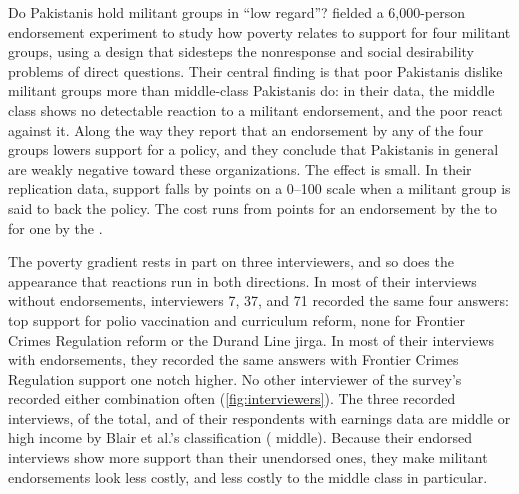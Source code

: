 \documentclass[11pt,letterpaper]{article}
\begin{document}
Do Pakistanis hold militant groups in ``low regard''? \citet{blair2013poverty} fielded a 6,000-person endorsement experiment to study how poverty relates to support for four militant groups, using a design that sidesteps the nonresponse and social desirability problems of direct questions. Their central finding is that poor Pakistanis dislike militant groups more than middle-class Pakistanis do: in their data, the middle class shows no detectable reaction to a militant endorsement, and the poor react against it. Along the way they report that an endorsement by any of the four groups lowers support for a policy, and they conclude that Pakistanis in general are weakly negative toward these organizations. The effect is small. In their replication data, support falls by \FullATEPoints{} points on a 0--100 scale when a militant group is said to back the policy. The cost runs from \BlairCueFullMin{} points for an endorsement by the \BlairCueWeakest{} to \BlairCueFullMax{} for one by the \BlairCueStrongest{}.

The poverty gradient rests in part on three interviewers, and so does the appearance that reactions run in both directions. In most of their interviews without endorsements, interviewers 7, 37, and 71 recorded the same four answers: top support for polio vaccination and curriculum reform, none for Frontier Crimes Regulation reform or the Durand Line jirga. In most of their interviews with endorsements, they recorded the same answers with Frontier Crimes Regulation support one notch higher. No other interviewer of the survey's \InterviewerCount{} recorded either combination often (\cref{fig:interviewers}). The three recorded \SuspectInterviews{} interviews, \SuspectShare{} of the total, and \BlairThreeNotLow{} of their respondents with earnings data are middle or high income by Blair et al.'s classification (\BlairThreeMiddle{} middle). Because their endorsed interviews show more support than their unendorsed ones, they make militant endorsements look less costly, and less costly to the middle class in particular.
\end{document}
